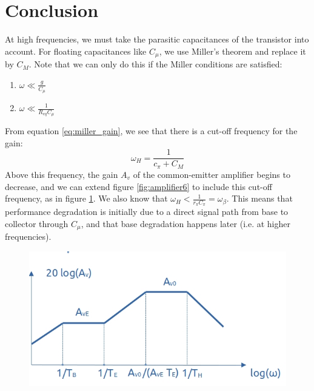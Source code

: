 \section{Conclusion}
At high frequencies, we must take the parasitic capacitances of the transistor into account. For floating capacitances like $C_\mu$, we use Miller's theorem and replace it by $C_M$. Note that we can only do this if the Miller conditions are satisfied:
\begin{enumerate}
	\item $\omega \ll \frac{g}{C_\mu}$
	\item $\omega \ll \frac{1}{R_{eq} C_\mu}$
\end{enumerate}
 From equation \ref{eq:miller_gain}, we see that there is a cut-off frequency for the gain:
$$
\omega_H = \frac{1}{c_\pi + C_M}
$$
Above this frequency, the gain $A_v$ of the common-emitter amplifier begins to decrease, and we can extend figure \ref{fig:amplifier6} to include this cut-off frequency, as in figure \ref{fig:milcap8}. We also know that $\omega_H < \frac{1}{r_\pi C_\pi} = \omega_\beta$. This means that performance degradation is initially due to a direct signal path from base to collector through $C_\mu$, and that base degradation happens later (i.e. at higher frequencies).

\begin{figure}[h!]
	\centering
	\includegraphics[width=12cm]{figures/ch03/milcap8.jpg}
	\caption{}
	\label{fig:milcap8}
\end{figure}
